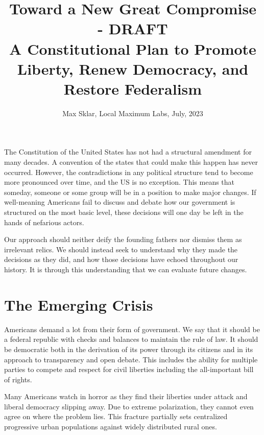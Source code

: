 \documentclass{article}
\begin{document}
\parindent=0in
\parskip=12pt

\title{
  Toward a New Great Compromise - DRAFT \\
  \large{
    A Constitutional Plan to Promote Liberty, Renew Democracy, and Restore Federalism
  }
}

\author{Max Sklar, Local Maximum Labs, July, 2023}
\date{}

\maketitle
\thispagestyle{empty}

The Constitution of the United States has not had a structural amendment for many decades. A convention of the states that could make this happen has never occurred. However, the contradictions in any political structure tend to become more pronounced over time, and the US is no exception. This means that someday, someone or some group will be in a position to make major changes. If well-meaning Americans fail to discuss and debate how our government is structured on the most basic level, these decisions will one day be left in the hands  of nefarious actors.

Our approach should neither deify the founding fathers nor dismiss them as irrelevant relics. We should instead seek to understand why they made the decisions as they did, and how those decisions have echoed throughout our history. It is through this understanding that we can evaluate future changes.

\section{The Emerging Crisis}

Americans demand a lot from their form of government. We say that it should be a federal republic with checks and balances to maintain the rule of law. It should be democratic both in the derivation of its power through its citizens and in its approach to transparency and open debate. This includes the ability for multiple parties to compete and respect for civil liberties including the all-important bill of rights.

Many Americans watch in horror as they find their liberties under attack and liberal democracy slipping away. Due to extreme polarization, they cannot even agree on where the problem lies. This fracture partially sets centralized progressive urban populations against widely distributed rural ones. 
\end{document}
